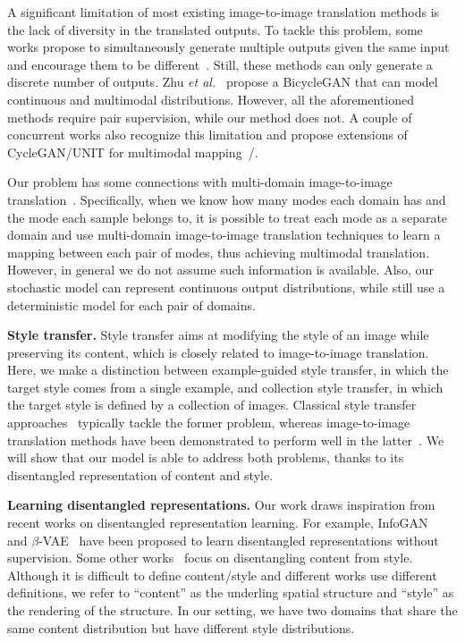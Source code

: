 \documentclass[runningheads]{llncs}
\newcommand{\vpara}[1]{\vspace{0.05in}\noindent\textbf{#1}}
\def\etal{\emph{et al.}\xspace}
\begin{document}
	A significant limitation of most existing image-to-image translation methods is the lack of diversity in the translated outputs. 
To tackle this problem, some works propose to simultaneously generate multiple outputs given the same input and encourage them to be different~\cite{chen2017photographic,ghosh2017multi,bansal2018pixelnn}. Still, these methods can only generate a discrete number of outputs. Zhu \etal~\cite{zhu2017toward} propose a BicycleGAN that can model continuous and multimodal distributions. However, all the aforementioned methods require pair supervision, while our method does not. A couple of concurrent works also recognize this limitation and propose extensions of CycleGAN/UNIT for multimodal mapping~\cite{almahairi2018augmented}/\cite{lee2018diverse}.
	
	Our problem has some connections with multi-domain image-to-image translation~\cite{choi2017stargan,anoosheh2017combogan,hui2017unsupervised}.
	Specifically, when we know how many modes each domain has and the mode each sample belongs to, it is possible to treat each mode as a separate domain and use multi-domain image-to-image translation techniques to learn a mapping between each pair of modes, thus achieving multimodal translation. However, in general we do not assume such information is available. Also, our stochastic model can represent continuous output distributions, while \cite{choi2017stargan,anoosheh2017combogan,hui2017unsupervised} still use a deterministic model for each pair of domains.
	
	\vpara{Style transfer.}  Style transfer aims at modifying the style of an image while preserving its content, which is closely related to image-to-image translation. Here, we make a distinction between example-guided style transfer, in which the target style comes from a single example, and collection style transfer, in which the target style is defined by a collection of images. Classical style transfer approaches~\cite{gatys2016image,hertzmann2001image,li2016combining,johnson2016perceptual,huang2017adain,li2017universal,li2018closed} typically tackle the former problem, whereas image-to-image translation methods have been demonstrated to perform well in the latter~\cite{zhu2017unpaired}. We will show that our model is able to address both problems, thanks to its disentangled representation of content and style.


	\vpara{Learning disentangled representations.} Our work draws inspiration from recent works on disentangled representation learning. For example, InfoGAN~\cite{chen2016infogan} and $\beta$-VAE~\cite{higgins2017beta} have been proposed to learn disentangled representations without supervision. Some other works~\cite{tenenbaum1997separating,bousmalis2016domain,villegas2017decomposing,mathieu2016disentangling,denton2017unsupervised,tulyakov2018mocogan,donahue2018semantically,shen2017style} focus on disentangling content from style. Although it is difficult to define content/style and different works use different definitions, we refer to ``content'' as the underling spatial structure and ``style'' as the rendering of the structure. In our setting, we have two domains that share the same content distribution but have different style distributions.
\end{document}
